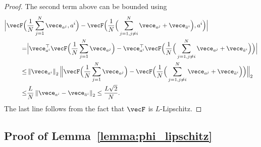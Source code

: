 \begin{proof}
The second term above can be bounded using
\begin{align*}
    \Big|\vecF\Big(&\frac{1}{N}\sum_{j=1}^N \vece_{a^j}, a^i\Big) -\vecF\Big( \frac{1}{N}\Big(\sum_{j=1, j\neq i}^N \vece_{a^j} + \vece_{\bar{a}^i}\Big), a^i\Big)\Big| \\
    = & \Big|\vece_{a^i}^\top\vecF\Big(\frac{1}{N}\sum_{j=1}^N \vece_{a^j}\Big) -\vece_{a^i}^\top \vecF\Big( \frac{1}{N}\Big(\sum_{j=1, j\neq i}^N \vece_{a^j} + \vece_{\bar{a}^i}\Big)\Big)\Big| \\
    \leq & \left\| \vece_{a^i} \right\|_2 \Big\| \vecF\Big(\frac{1}{N}\sum_{j=1}^N \vece_{a^j}\Big) -\vecF\Big( \frac{1}{N}\Big(\sum_{j=1, j\neq i}^N \vece_{a^j} + \vece_{\bar{a}^i}\Big)\Big) \Big\|_2 \\
    \leq & \frac{L}{N} \left\| \vece_{a^i} - \vece_{\bar{a}^i}\right\|_2 \leq \frac{L\sqrt{2}}{N}.
\end{align*}
The last line follows from the fact that $\vecF$ is $L$-Lipschitz.
\end{proof}

\subsection{Proof of Lemma~\ref{lemma:phi_lipschitz}}\label{sec:extended_proof_lema_lipschitz_phi}

